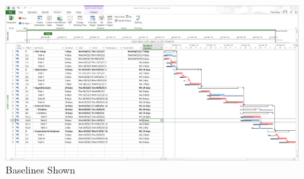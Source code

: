 \begin{figure}[hb]
	\centering
		\includegraphics[width=1.00\textwidth]{img/Baselines.PNG}
	\caption{Baselines Shown}
	\label{fig:P4Baseline}
\end{figure}

